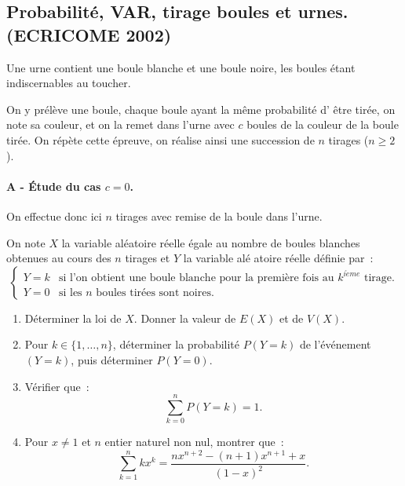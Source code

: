 \subsection{Probabilité, VAR, tirage boules et urnes. (ECRICOME 2002) }
\begin{exercice}




Une urne contient une boule blanche et une boule noire, les boules \'etant
indiscernables au toucher.

On y pr\'el\`eve une boule, chaque boule ayant la m\^{e}me probabilit\'e d'%
\^{e}tre tir\'ee, on note sa couleur, et on la remet dans l'urne avec $c$
boules de la couleur de la boule tir\'ee. On r\'ep\`ete cette \'epreuve, on
r\'ealise ainsi une succession de $n$ tirages ($n\geqslant 2$).

\paragraph{\small{A - \'Etude du cas $c=0$.}\\}

On effectue donc ici $n$ tirages avec remise de la boule dans l'urne.

On note $X$ la variable al\'{e}atoire r\'{e}elle \'{e}gale au nombre de
boules blanches obtenues au cours des $n$ tirages et $Y$ la variable al\'{e}%
atoire r\'{e}elle d\'{e}finie par~: 
\begin{equation*}
\begin{cases}
Y=k & \text{si l'on obtient une boule blanche pour la premi\`{e}re fois au }%
k^{i\grave{e}me}\text{ tirage.} \\ 
Y=0 & \text{si les $n$ boules tir\'{e}es sont noires.}%
\end{cases}%
\end{equation*}

\begin{enumerate}
\item D\'{e}terminer la loi de $X$. Donner la valeur de $E(X)$ et de $V(X)$.

\item Pour $k\in \{1,\ldots ,n\}$, d\'{e}terminer la probabilit\'{e} $P(Y=k) 
$ de l'\'{e}v\'{e}nement $(Y=k)$, puis d\'{e}terminer $P(Y=0)$.

\item V\'{e}rifier que~: 
\begin{equation*}
\sum_{k=0}^{n}P(Y=k)=1.
\end{equation*}

\item Pour $x\neq 1$ et $n$ entier naturel non nul, montrer que~: 
\begin{equation*}
\sum_{k=1}^{n}kx^{k}=\frac{nx^{n+2}-(n+1)x^{n+1}+x}{(1-x)^{2}}.
\end{equation*}


\end{enumerate}
\end{exercice}
